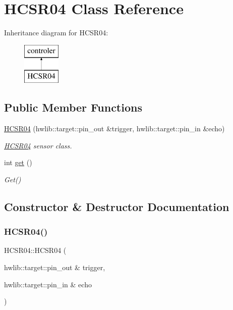 \hypertarget{class_h_c_s_r04}{}\section{H\+C\+S\+R04 Class Reference}
\label{class_h_c_s_r04}
Inheritance diagram for H\+C\+S\+R04\+:\begin{figure}[H]
\begin{center}
\leavevmode
\includegraphics[height=2.000000cm]{class_h_c_s_r04}
\end{center}
\end{figure}
\subsection*{Public Member Functions}
\begin{DoxyCompactItemize}
\item 
\mbox{\hyperlink{class_h_c_s_r04_a6630d5354ee9fb0abdb70c5dbbb2e130}{H\+C\+S\+R04}} (hwlib\+::target\+::pin\+\_\+out \&trigger, hwlib\+::target\+::pin\+\_\+in \&echo)
\begin{DoxyCompactList}\small\item\em \mbox{\hyperlink{class_h_c_s_r04}{H\+C\+S\+R04}} sensor class. \end{DoxyCompactList}\item 
int \mbox{\hyperlink{class_h_c_s_r04_aced49671ccc6cf679e045d2fb9709d8c}{get}} ()
\begin{DoxyCompactList}\small\item\em Get() \end{DoxyCompactList}\end{DoxyCompactItemize}


\subsection{Constructor \& Destructor Documentation}
\mbox{\label{class_h_c_s_r04_a6630d5354ee9fb0abdb70c5dbbb2e130}} 
\subsubsection{\texorpdfstring{H\+C\+S\+R04()}{HCSR04()}}
{\footnotesize\ttfamily H\+C\+S\+R04\+::\+H\+C\+S\+R04 (\begin{DoxyParamCaption}\item[{hwlib\+::target\+::pin\+\_\+out \&}]{trigger,  }\item[{hwlib\+::target\+::pin\+\_\+in \&}]{echo }\end{DoxyParamCaption})}



